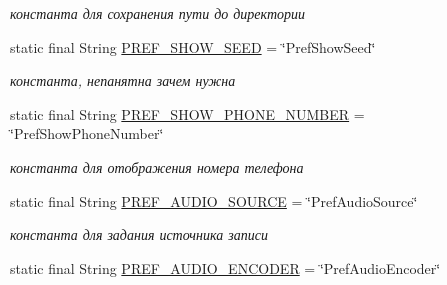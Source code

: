 \begin{DoxyCompactItemize}
\begin{DoxyCompactList}\small\item\em константа для сохранения пути до директории \end{DoxyCompactList}\item 
\mbox{\label{classcom_1_1aykuttasil_1_1callrecord_1_1_call_record_ac9a6ae5d187f63d213a6d8f9ffb31d37}} 
static final String \hyperlink{classcom_1_1aykuttasil_1_1callrecord_1_1_call_record_ac9a6ae5d187f63d213a6d8f9ffb31d37}{P\+R\+E\+F\+\_\+\+S\+H\+O\+W\+\_\+\+S\+E\+ED} = \char`\"{}Pref\+Show\+Seed\char`\"{}
\begin{DoxyCompactList}\small\item\em константа, непанятна зачем нужна \end{DoxyCompactList}\item 
\mbox{\label{classcom_1_1aykuttasil_1_1callrecord_1_1_call_record_ab0484fa6142468ce2c17ebc3b8c276c7}} 
static final String \hyperlink{classcom_1_1aykuttasil_1_1callrecord_1_1_call_record_ab0484fa6142468ce2c17ebc3b8c276c7}{P\+R\+E\+F\+\_\+\+S\+H\+O\+W\+\_\+\+P\+H\+O\+N\+E\+\_\+\+N\+U\+M\+B\+ER} = \char`\"{}Pref\+Show\+Phone\+Number\char`\"{}
\begin{DoxyCompactList}\small\item\em константа для отображения номера телефона \end{DoxyCompactList}\item 
\mbox{\label{classcom_1_1aykuttasil_1_1callrecord_1_1_call_record_ab42416e630439cf8681ad22afdb55255}} 
static final String \hyperlink{classcom_1_1aykuttasil_1_1callrecord_1_1_call_record_ab42416e630439cf8681ad22afdb55255}{P\+R\+E\+F\+\_\+\+A\+U\+D\+I\+O\+\_\+\+S\+O\+U\+R\+CE} = \char`\"{}Pref\+Audio\+Source\char`\"{}
\begin{DoxyCompactList}\small\item\em константа для задания источника записи \end{DoxyCompactList}\item 
\mbox{\label{classcom_1_1aykuttasil_1_1callrecord_1_1_call_record_a348fa9cd2f19a89da0aa23c7414dd70d}} 
static final String \hyperlink{classcom_1_1aykuttasil_1_1callrecord_1_1_call_record_a348fa9cd2f19a89da0aa23c7414dd70d}{P\+R\+E\+F\+\_\+\+A\+U\+D\+I\+O\+\_\+\+E\+N\+C\+O\+D\+ER} = \char`\"{}Pref\+Audio\+Encoder\char`\"{}

\end{DoxyCompactItemize}
